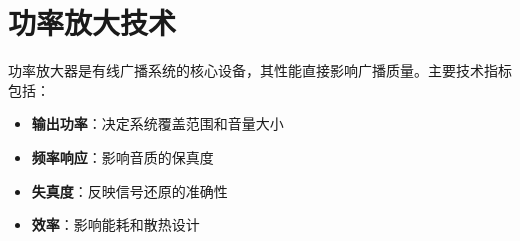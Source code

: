 \documentclass[12pt,UTF8]{ctexbook}
\begin{document}
\section{功率放大技术}

功率放大器是有线广播系统的核心设备，其性能直接影响广播质量。主要技术指标包括：

\begin{itemize}[leftmargin=3.5em]
    \item \textbf{输出功率}：决定系统覆盖范围和音量大小
    \item \textbf{频率响应}：影响音质的保真度
    \item \textbf{失真度}：反映信号还原的准确性
    \item \textbf{效率}：影响能耗和散热设计
\end{itemize}

\backmatter
\end{document}
